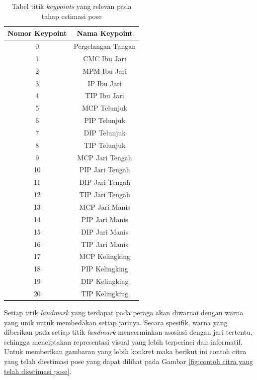 \begin{table}[H]
\centering
    \caption{Tabel titik \emph{keypoints} yang relevan pada tahap estimasi pose}
    \label{tbl:titik keypoints}
    \begin{tabular}{|c|c|}
        \hline
        Nomor Keypoint & Nama Keypoint      \\ \hline
        0              & Pergelangan Tangan \\ \hline
        1              & CMC Ibu Jari       \\ \hline
        2              & MPM Ibu Jari       \\ \hline
        3              & IP Ibu Jari        \\ \hline
        4              & TIP Ibu Jari       \\ \hline
        5              & MCP Telunjuk       \\ \hline
        6              & PIP Telunjuk       \\ \hline
        7              & DIP Telunjuk       \\ \hline
        8              & TIP Telunjuk       \\ \hline
        9              & MCP Jari Tengah    \\ \hline
        10             & PIP Jari Tengah    \\ \hline
        11             & DIP Jari Tengah    \\ \hline
        12             & TIP Jari Tengah    \\ \hline
        13             & MCP Jari Manis     \\ \hline
        14             & PIP Jari Manis     \\ \hline
        15             & DIP Jari Manis     \\ \hline
        16             & TIP Jari Manis     \\ \hline
        17             & MCP Kelingking     \\ \hline
        18             & PIP Kelingking     \\ \hline
        19             & DIP Kelingking     \\ \hline
        20             & TIP Kelingking     \\ \hline
    \end{tabular}
\end{table}

Setiap titik \emph{landmark} yang terdapat pada peraga akan diwarnai dengan warna yang unik untuk membedakan setiap jarinya. Secara spesifik, warna yang diberikan pada setiap titik \emph{landmark} mencerminkan asosiasi dengan jari tertentu, sehingga menciptakan representasi visual yang lebih terperinci dan informatif. Untuk memberikan gambaran yang lebih konkret maka berikut ini contoh citra yang telah diestimasi pose yang dapat dilihat pada Gambar \ref{fig:contoh citra yang telah diestimasi pose}.

